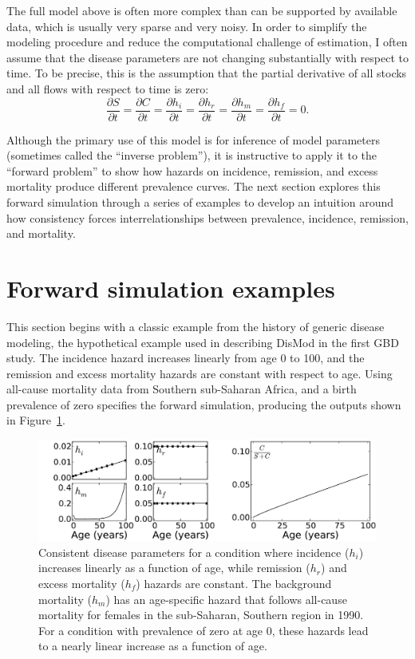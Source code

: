 The full model above is often more complex than can be supported by
available data, which is usually very sparse and very noisy.  In order
to simplify the modeling procedure and reduce the computational challenge
of estimation, I often assume that the disease parameters are not changing
substantially with respect to time. To be precise, this is the assumption
that the partial derivative of all stocks and all flows with respect
to time is zero:
\[
\frac{\partial S}{\partial t}
=
\frac{\partial C}{\partial t}
=
\frac{\partial h_i}{\partial t}
=
\frac{\partial h_r}{\partial t}
=
\frac{\partial h_m}{\partial t}
=
\frac{\partial h_f}{\partial t}
=
0.
\]

Although the primary use of this model is for inference of model
parameters (sometimes called the ``inverse problem''), it is
instructive to apply it to the ``forward problem'' to show how hazards on incidence,
remission, and excess mortality produce different prevalence
curves. The next section explores this forward simulation through a
series of examples to develop an intuition around how consistency
forces interrelationships between prevalence, incidence, remission,
and mortality.


\section{Forward simulation examples}

This section begins with a classic example from the history of generic
disease modeling, the hypothetical example used in describing DisMod
in the first GBD study.\cite{harvard_school_of_public_health.;world_health_organization.;world_bank._global_1996}
The incidence hazard increases linearly from age 0 to
100, and the remission and excess mortality hazards are constant with
respect to age.  Using all-cause mortality data from Southern sub-Saharan
Africa, and a birth prevalence of zero specifies
the forward simulation, producing the outputs shown in
Figure~\ref{forward-sim-ex1}.

\begin{figure}[htb]
\begin{center}
\includegraphics[width=\textwidth]{initial.pdf}
\caption{Consistent disease parameters for a condition where incidence
  ($h_i$) increases linearly as a function of age, while remission
  ($h_r$) and excess mortality ($h_f$) hazards are constant. The
  background mortality ($h_m$) has an age-specific hazard that follows
  all-cause mortality for females in the sub-Saharan, Southern region
  in 1990. For a condition with prevalence of zero at age $0$, these
  hazards lead to a nearly linear increase as a function of age.}
\label{forward-sim-ex1}
\end{center}
\end{figure}


